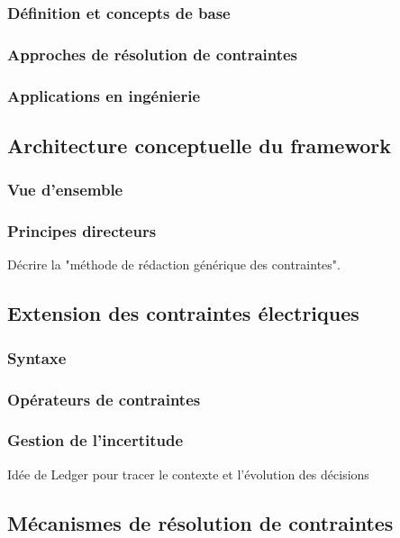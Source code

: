 \documentclass[a4paper,12pt]{article}
\begin{document}
\subsubsection{Définition et concepts de base}
\label{sec:org65c57cc}
\subsubsection{Approches de résolution de contraintes}
\label{sec:org9fda91e}
\subsubsection{Applications en ingénierie}
\label{sec:org622945e}
\subsection{Architecture conceptuelle du framework}
\label{sec:org06a9564}
\subsubsection{Vue d'ensemble}
\label{sec:org6ada48d}
\subsubsection{Principes directeurs}
\label{sec:org9e4ed73}
Décrire la "méthode de rédaction générique des contraintes".
\subsection{Extension des contraintes électriques}
\label{sec:org18b8331}
\subsubsection{Syntaxe}
\label{sec:org9faf276}
\subsubsection{Opérateurs de contraintes}
\label{sec:org4bc8c9c}
\subsubsection{Gestion de l'incertitude}
\label{sec:org7770494}
Idée de Ledger pour tracer le contexte et l'évolution des décisions
\subsection{Mécanismes de résolution de contraintes}
\label{sec:orgccba7cb}
\end{document}
